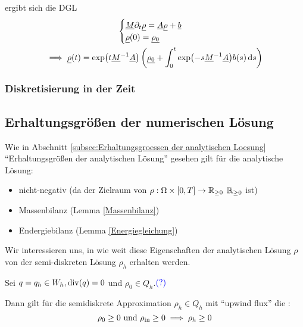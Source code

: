 ergibt sich die DGL
\begin{gather*}
\begin{cases}
\underline{M} \partial_t \underline{\rho} = \underline{A} \underline{\rho} + \underline{b} \\
\underline{\rho}(0) = \underline{\rho_0}
\end{cases}\\
\implies \underline{\rho}(t) = \exp(t \underline{M}^{-1} \underline{A}) \left( \underline{\rho_0} + \int_{0}^{t} \exp(-s\underline{M}^{-1} \underline{A}) b(s) \mathop{}\!\mathrm{d} s \right) 
\end{gather*}

\subsubsection{Diskretisierung in der Zeit}

\subsection{Erhaltungsgrößen der numerischen Lösung}

\begin{repetition}
	Wie in Abschnitt \ref{subsec:Erhaltungsgroessen der analytischen Loesung} \enquote{Erhaltungsgrößen der analytischen Lösung} gesehen gilt für die analytische Lösung:
	\begin{itemize}
		\item nicht-negativ (da der Zielraum von $ \rho: \Omega \times [0,T] \to \mathbb{R}_{\geq 0}$ $ \mathbb{R}_{\geq 0} $ ist)
		\item Massenbilanz (Lemma \ref{Massenbilanz})
		\item Endergiebilanz (Lemma \ref{Energiegleichung})
	\end{itemize}
\end{repetition}

Wir interessieren uns, in wie weit diese Eigenschaften der analytischen Lösung $ \rho $ von der semi-diskreten Lösung $ \rho_h $ erhalten werden.


 
\begin{Lemma} \label{disktrete Nicht-Negativität}
		Sei $ q = q_h \in W_h, \operatorname{div}(q) = 0 $ und $ \rho_0 \in Q_h $.$ \textcolor{blue}{(?)} $ %
	
	Dann gilt für die semidiskrete Approximation $ \rho_h \in Q_h$ mit \enquote{upwind flux} die :
	\[ \rho_0 \geq 0 \text{ und } \rho_{\text{in}} \geq 0 \implies \rho_h \geq 0 \]
\end{Lemma}

